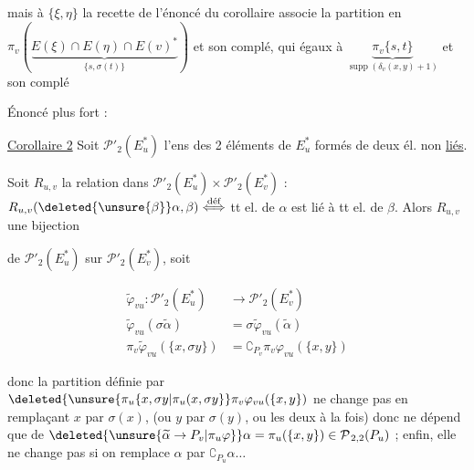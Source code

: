 mais à $\{\xi,\eta\}$ la recette  de l'énoncé du corollaire associe la partition en $\pi_v(\underbrace{E(\xi)\cap E(\eta)\cap E(v)^*}_{\{s,\sigma(t)\}})$ et son complé, qui  égaux à $\underbrace{\pi_v\{s,t\}}_{\operatorname{supp}(\delta_v(x,y)+1)}$ et son complé \unsure{---|\dots}

Énoncé plus fort :

\uline{Corollaire 2} Soit $\mathcal P'_2(E_u^*)$ l'ens des  2 éléments de $E_u^*$ formés de deux él. non \uline{liés}.

Soit $R_{u,v}$ la relation  dans $\mathcal P'_2(E_u^*)\times\mathcal P'_2(E_v^*)$ : $R_{u,v}(\deleted{\unsure{\beta}}\alpha,\beta)\overset{\text{déf}}{\Longleftrightarrow}$ tt el. de $\alpha$ est lié à tt el. de $\beta$. Alors $R_{u,v}$  une bijection


de $\mathcal P'_2(E_u^*)$ sur $\mathcal P'_2(E_v^*)$, soit \deleted{$\varphi$}

\[
\begin{aligned}
\widetilde\varphi_{vu}:\mathcal P'_2(E_u^*)&\longrightarrow\mathcal P'_2(E_v^*)\\
\widetilde\varphi_{vu}(\sigma\widetilde\alpha)&=\sigma\widetilde\varphi_{vu}(\widetilde\alpha)\\
\pi_v\widetilde\varphi_{vu}(\{x,\sigma y\})&=\complement_{P_v}\pi_v\varphi_{vu}(\{x,y\})
\end{aligned}
\]

donc la partition définie par $\deleted{\unsure{\pi_u\{x,\sigma y|\pi_u(x,\sigma y}}\pi_v\varphi_{vu}(\{x,y\})$ ne change pas en remplaçant $x$ par $\sigma(x)$, (ou $y$ par $\sigma(y)$, ou les deux à la fois) donc ne dépend que de $\deleted{\unsure{\widetilde\alpha\rightarrow P_v|\pi_u\varphi}}\alpha=\pi_u(\{x,y\})\in\mathcal P_{\,2,2}(P_u)$ ; enfin, elle ne change pas si on remplace $\alpha$ par $\complement_{P_u}\alpha\dots$

